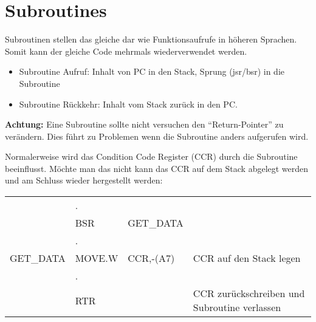 \section{Subroutines}
Subroutinen stellen das gleiche dar wie Funktionsaufrufe in höheren Sprachen. Somit kann der gleiche Code mehrmals wiederverwendet werden.
\begin{itemize}
  \item Subroutine Aufruf: Inhalt von PC in den Stack, Sprung (jsr/bsr) in die Subroutine
  \item Subroutine Rückkehr: Inhalt vom Stack zurück in den PC.
\end{itemize}
\textbf{Achtung:} Eine Subroutine sollte nicht versuchen den "`Return-Pointer"' zu verändern. Dies führt zu Problemen wenn die Subroutine anders aufgerufen wird.

Normalerweise wird das Condition Code Register (CCR) durch die Subroutine beeinflusst. Möchte man das nicht kann das CCR auf dem Stack abgelegt werden und am Schluss wieder hergestellt werden: \\
\begin{tabular}{llll}
	& . & & \\
	& BSR & GET\_DATA & \\
	& . & & \\
	GET\_DATA & MOVE.W & CCR,-(A7) & CCR auf den Stack legen \\
	& . & & \\
	& RTR & & CCR zurückschreiben und Subroutine verlassen
\end{tabular}

